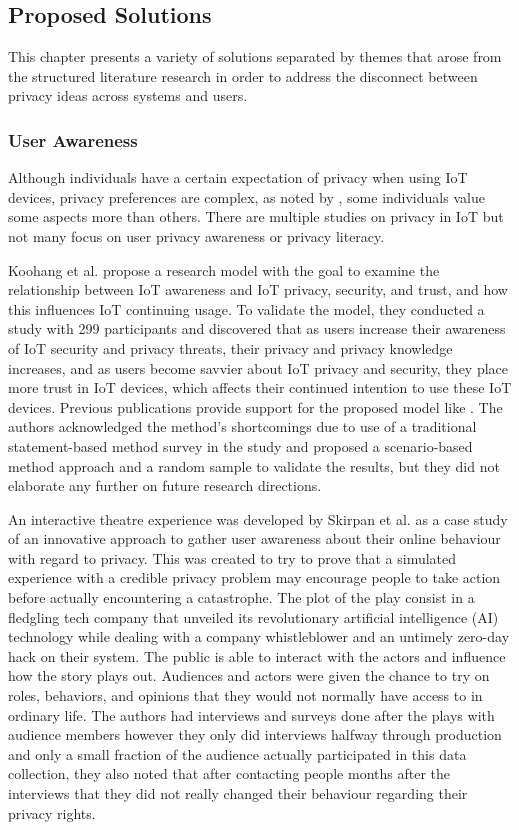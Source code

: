 \subsection{Proposed Solutions}

\par This chapter presents a variety of solutions separated by themes that arose
from the structured literature research in order to address the disconnect
between privacy ideas across systems and users.

\subsubsection{User Awareness}

Although individuals have a certain expectation of privacy when using IoT
devices, privacy preferences are complex, as noted by \cite{naeini2017privacy},
some individuals value some aspects more than others. There are multiple studies
on privacy in IoT but not many focus on user privacy awareness or
privacy literacy.

Koohang et al. \cite{koohang2022internet} propose a research model with
the goal to examine the relationship between IoT awareness and IoT privacy,
security, and trust, and how this influences IoT continuing usage. To validate
the model, they conducted a study with 299 participants and discovered that
as users increase their awareness of IoT security and privacy threats, their
privacy and privacy knowledge increases, and as users become savvier about
IoT privacy and security, they place more trust in IoT devices, which affects
their continued intention to use these IoT devices. Previous publications
provide support for the proposed model like \cite{tsourela2020internet, knijnenburg2022modern}.
The authors acknowledged the method's shortcomings due to use of a traditional
statement-based method survey in the study and proposed a scenario-based
method approach and a random sample to validate the results, but they did
not elaborate any further on future research directions.

An interactive theatre experience was developed by Skirpan et al. \cite{SkirpanPrivacy}
as a case study of an innovative approach to gather user awareness about their
online behaviour with regard to privacy. This was created to try to prove
that a simulated experience with a credible privacy problem may encourage
people to take action before actually encountering a catastrophe. The plot
of the play consist in a fledgling tech company that unveiled its revolutionary
artificial intelligence (AI) technology while dealing with a company whistleblower and an untimely
zero-day hack on their system. The public is able to interact with the actors
and influence how the story plays out. Audiences and actors were given the
chance to try on roles, behaviors, and opinions that they would not normally
have access to in ordinary life. The authors had interviews and surveys
done after the plays with audience members however they only did interviews
halfway through production and only a small fraction of the audience actually
participated in this data collection, they also noted that after contacting
people months after the interviews that they did not really changed their
behaviour regarding their privacy rights.

